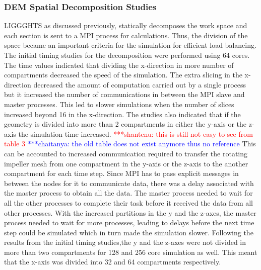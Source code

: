 \documentclass[preprint,11pt,authoryear]{elsarticle}
\newcommand{\jhanote}[1]{ {\textcolor{red} { ***shantenu: #1 }}}
\newcommand{\csnote}[1]{ {\textcolor{blue} { ***chaitanya: #1 }}}
\newcommand{\gpnote}[1]{{\textcolor{green} {***giannis: #1}}}
\newcommand{\jhanote}[1]{ {\textcolor{red} { ***shantenu: #1 }}}
\newcommand{\csnote}[1]{}
\newcommand{\gpnote}[1]{}
\begin{document}
\subsubsection{DEM Spatial Decomposition Studies}
LIGGGHTS as discussed previously, statically decomposes the work space and
each section is sent to a MPI process for calculations. Thus, the division of
the space became an important criteria for the simulation for efficient load
balancing. The initial timing studies for the decomposition were performed using 64
cores. The time values indicated that dividing the
x-direction in more number of compartments decreased the speed of the simulation. 
The extra slicing in the x-direction decreased the amount of computation carried out by 
a single process but it increased the number of communications in between the MPI slave 
and master processes. This led to slower simulations when the number of slices 
increased beyond 16 in the x-direction. 
The studies also indicated that if the geometry is divided into more than 2 compartments 
in either the y-axis or the z-axis the simulation time increased. 
\jhanote{this is still not easy to see from table 3} \csnote{the old table does not exist anymore thus no reference}
This can be accounted to increased communication required to transfer 
the rotating impeller mesh from one compartment in the y-axis or the z-axis 
to the another compartment for each time step. Since MPI has to pass explicit 
messages in between the nodes for it to communicate data, there was a delay 
associated with the master process to obtain all the data. The master process
needed to wait for all the other processes to complete their task before it received 
the data from all other processes. With the increased 
partitions in the y and the z-axes, the master process needed to wait for more 
processes, leading to delays before the next time step could be simulated which 
in turn made the simulation slower.
Following the results from the initial timing studies,the y and the z-axes were not divided
in more than two compartments for 128 and 256 core simulation as well. This
meant that the x-axis was divided into 32 and 64 compartments respectively. 
\end{document}
